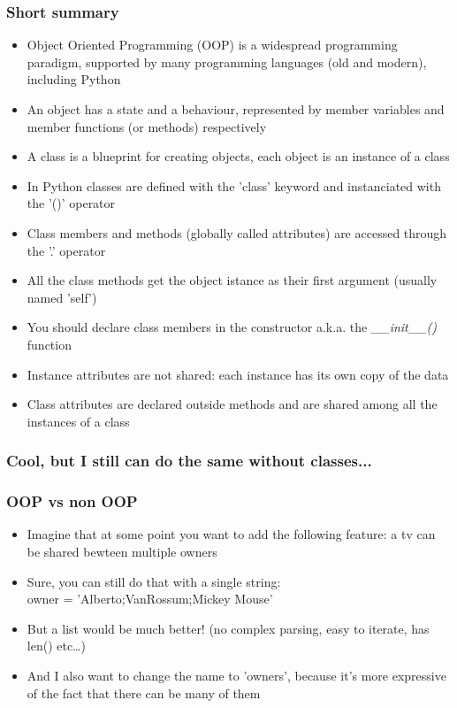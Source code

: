 \documentclass[9pt]{beamer}
\begin{document}
\begin{frame}
  \frametitle{Short summary}
  
  \begin{itemize}
    \footnotesize
    \item Object Oriented Programming (OOP) is a widespread programming paradigm,
          supported by many programming languages (old and modern), including Python
    \medskip
    \item An object has a state and a behaviour, represented by member variables
          and member functions (or methods) respectively
    \medskip
    \item A class is a blueprint for creating objects, each object is an instance of a class
    \medskip
    \item In Python classes are defined with the 'class' keyword and instanciated with the '()' operator
    \medskip
    \item Class members and methods (globally called attributes) are accessed through the '.' operator
    \medskip
    \item All the class methods get the object istance as their first argument (usually named 'self')
    \medskip
    \item You should declare class members in the constructor a.k.a. the \emph{\_\_init\_\_()} function
    \medskip
    \item Instance attributes are not shared: each instance has its own copy of the data
    \medskip
    \item Class attributes are declared outside methods and are shared among all the instances of a class
  \end{itemize}
  
\end{frame}




\begin{frame}
  \frametitle{Cool, but I still can do the same without classes...}
  
\end{frame}


\begin{frame}
  \frametitle{OOP vs non OOP}
  
  \begin{itemize}
    \item Imagine that at some point you want to add the following feature: 
          a tv can be shared bewteen multiple owners
    \bigskip
    \item Sure, you can still do that with a single string: \\owner = 'Alberto;VanRossum;Mickey Mouse'
    \bigskip
    \item But a list would be much better! (no complex parsing, easy to iterate, has len() etc\dots)
    \bigskip
    \item And I also want to change the name to 'owners', because it's more expressive of the fact that there can be many of them
  \end{itemize}

\end{frame}
\end{document}
